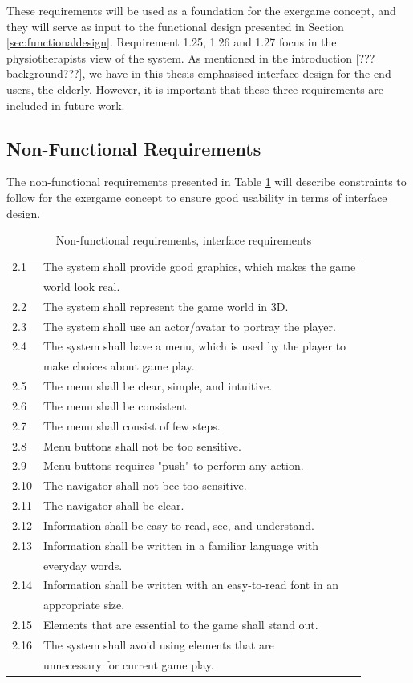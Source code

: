 These requirements will be used as a foundation for the exergame concept, and they will serve as input to the functional design presented in Section \ref{sec:functionaldesign}. Requirement 1.25, 1.26 and 1.27 focus in the physiotherapists view of the system. As mentioned in the introduction [??? background???], we have in this thesis emphasised interface design for the end users, the elderly. However, it is important that these three requirements are included in future work.

\subsection{Non-Functional Requirements}
The non-functional requirements presented in Table \ref{tab:nfunc} will describe constraints to follow for the exergame concept to ensure good usability in terms of interface design.

\begin{table} [H]
\centering
\begin{tabular}{|>{\raggedright}p{}|p{}|} 
\hline
2.1 & The system shall provide good graphics, which makes the game \\ & world look real. \\ \hline
2.2 & The system shall represent the game world in 3D.\\ \hline
2.3 & The system shall use an actor/avatar to portray the player.\\ \hline
2.4 & The system shall have a menu, which is used by the player to \\ & make choices about game play.\\ \hline
2.5 & The menu shall be clear, simple, and intuitive.\\ \hline
2.6 & The menu shall be consistent. \\ \hline
2.7 & The menu shall consist of few steps.\\ \hline
2.8 & Menu buttons shall not be too sensitive.\\ \hline
2.9 & Menu buttons requires "push" to perform any action.\\ \hline
2.10 & The navigator shall not bee too sensitive. \\ \hline
2.11 & The navigator shall be clear.\\ \hline
2.12 & Information shall be easy to read, see, and understand.\\ \hline
2.13 & Information shall be written in a familiar language with \\ & everyday words.  \\ \hline
2.14 & Information shall be written with an easy-to-read font in an \\ & appropriate size. \\ \hline
2.15 & Elements that are essential to the game shall stand out.\\ \hline
2.16 & The system shall avoid using elements that are \\ & unnecessary for current game play.\\ \hline
\end{tabular}
\caption[Non-functional requirements]{Non-functional requirements, interface requirements}
\label{tab:nfunc}
\end{table} 

